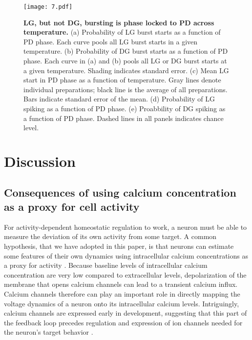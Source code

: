 \documentclass[9pt,lineno]{elife}
\begin{document}
\begin{figure}[!htp]
\centering
\begin{fullwidth}
\texttt{[image: 7.pdf]}
\end{fullwidth}
\caption{\textbf{LG, but not DG, bursting is phase locked to PD across temperature.} (a) Probability of LG burst starts as a function of PD phase. Each curve pools all LG burst starts in a given temperature.  (b) Probability of DG burst starts as a function of PD phase. Each curve in (a) and (b) pools all LG or DG burst starts at a given temperature. Shading indicates standard error.  (c) Mean LG start in PD phase as a function of temperature. Gray lines denote individual preparations; black line is the average of all preparations. Bars indicate standard error of the mean. (d) Probability of LG spiking as a function of PD phase. (e) Proabbility of DG spiking as a function of PD phase.  Dashed lines in all panels indicates chance level.}
\end{figure}


\section{Discussion}




\subsection{Consequences of using calcium concentration as a proxy for cell activity}

For activity-dependent homeostatic regulation to work, a neuron must be able to measure the deviation of its own activity from some target. A common hypothesis, that we have adopted in this paper, is that neurons can estimate some features of their own dynamics using intracellular calcium concentrations as a proxy for activity \citep{LeMasson:1993jz,Siegel:1994ue,Gunay:2010jh,Golowasch:1999ha,Davis:2006wd,OLeary:2011fd}. Because baseline levels of intracellular calcium concentration are very low compared to extracellular levels, depolarization of the membrane that opens calcium channels can lead to a transient calcium influx. Calcium channels therefore can play an important role in directly mapping the voltage dynamics of a neuron onto its intracellular calcium levels. Intriguingly, calcium channels are expressed early in development, suggesting that this part of the feedback loop precedes regulation and expression of ion channels needed for the neuron's target behavior \citep{Baccaglini:1977, Liljelund:2000em, Yamashita:1993fy, Faure:2001gg,Heusser:2005jz}.
\end{document}
